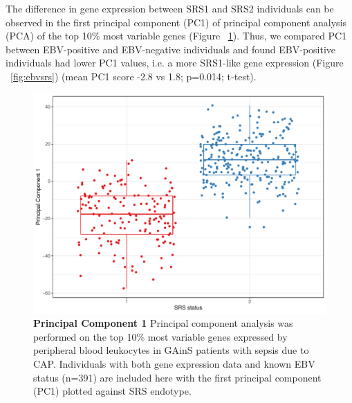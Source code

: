 The difference in gene expression between SRS1 and SRS2 individuals can be observed in the first principal component (PC1) of principal component analysis (PCA) of the top 10\% most variable genes (Figure ~\ref{fig:pc1}). Thus, we compared PC1 between EBV-positive and EBV-negative individuals and found EBV-positive individuals had lower PC1 values, i.e. a more SRS1-like gene expression (Figure ~\ref{fig:ebvsrs}) (mean PC1 score -2.8 vs 1.8; p=0.014; t-test).

\FloatBarrier
\begin{figure}[htbp]
\centering
\includegraphics[scale=0.6]{./Results3/Images/PC1.pdf}
\caption[Principal Component 1]{\textbf{Principal Component 1} Principal component analysis was performed on the top 10\% most variable genes expressed by peripheral blood leukocytes in GAinS patients with sepsis due to CAP. Individuals with both gene expression data and known EBV status (n=391) are included here with the first principal component (PC1) plotted against SRS endotype.}
\label{fig:pc1}
\end{figure}


